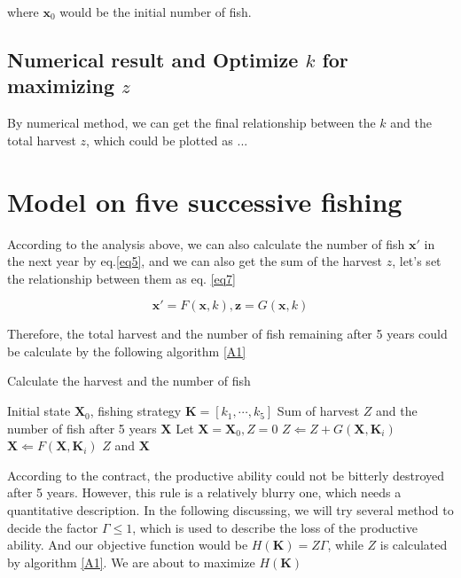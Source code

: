 \documentclass{IEEEtran}
\begin{document}
where $\bm x_0$ would be the initial number of fish.

\subsection{Numerical result and Optimize $k$ for maximizing $z$}

By numerical method, we can get the final relationship between the $k$ and the total harvest $z$, which could be plotted as ...

%
%
\section{Model on five successive fishing}

According to the analysis above, we can also calculate the number of fish $\bm x'$ in the next year by eq.\ref{eq5}, and we can also get the sum of the harvest $z$, let's set the relationship between them as eq. \ref{eq7}

\begin{equation}
    \label{eq7}
    \bm x' = F(\bm x, k), \bm z = G(\bm x,k)
\end{equation}

Therefore, the total harvest and the number of fish remaining after 5 years could be calculate by the following algorithm \ref{A1}

\begin{algorithm}[h]
    \caption{Calculate the harvest and the number of fish}\label{A1}
    \begin{algorithmic}
        \Require Initial state $\bm X_0$, fishing strategy $\bm K = [k_1,\cdots,k_5]$ 
        \Ensure Sum of harvest $Z$ and the number of fish after 5 years $\bm X$
        \State Let $\bm X = \bm X_0, Z = 0$
        \State $Z \Leftarrow Z + G(\bm X,\bm K_i)$
        \State $\bm X \Leftarrow F(\bm X, \bm K_i)$
        \EndFor
    \State \Return $Z$ and $\bm X$
    \end{algorithmic}
\end{algorithm}

According to the contract, the productive ability could not be bitterly destroyed after 5 years. However, this rule is a relatively blurry one, which needs a quantitative description. In the following discussing, we will try several method to decide the factor $\Gamma \le 1$, which is used to describe the loss of the productive ability. And our objective function would be $H(\bm K) = Z\Gamma$, while $Z$ is calculated by algorithm \ref{A1}. We are about to maximize $H(\bm K)$
\end{document}
